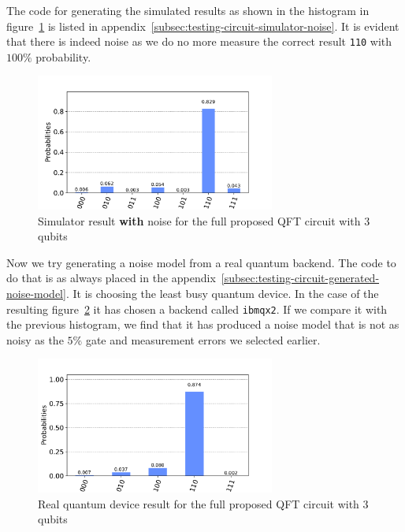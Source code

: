 The code for generating the simulated results as shown in the histogram in figure~\ref{fig:test-histogram-with-noise} is listed in appendix~\ref{subsec:testing-circuit-simulator-noise}.
It is evident that there is indeed noise as we do no more measure the correct result \texttt{110} with \(100 \%\) probability.

\begin{figure}[H]
    \centering
    \includegraphics[width=0.7\textwidth]{res/test-histogram-with-noise.pdf}
    \caption{Simulator result \textbf{with} noise for the full proposed QFT circuit with 3 qubits}
    \label{fig:test-histogram-with-noise}
\end{figure}

Now we try generating a noise model from a real quantum backend.
The code to do that is as always placed in the appendix~\ref{subsec:testing-circuit-generated-noise-model}.
It is choosing the least busy quantum device.
In the case of the resulting figure~\ref{fig:test-histogram-generated-noise-model} it has chosen a backend called \texttt{ibmqx2}.
If we compare it with the previous histogram, we find that it has produced a noise model that is not as noisy as the \(5 \%\) gate and measurement errors we selected earlier.

\begin{figure}[H]
    \centering
    \includegraphics[width=0.7\textwidth]{res/test-histogram-generated-noise-model.pdf}
    \caption{Real quantum device result for the full proposed QFT circuit with 3 qubits}
    \label{fig:test-histogram-generated-noise-model}
\end{figure}

